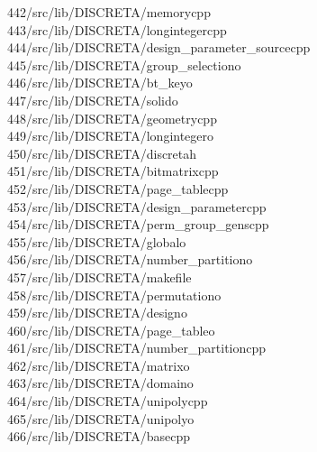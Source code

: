 \begin{tabbing}
442\>/src/lib/DISCRETA/memorycpp\\[0pt]
443\>/src/lib/DISCRETA/longintegercpp\\[0pt]
444\>/src/lib/DISCRETA/design\_parameter\_sourcecpp\\[0pt]
445\>/src/lib/DISCRETA/group\_selectiono\\[0pt]
446\>/src/lib/DISCRETA/bt\_keyo\\[0pt]
447\>/src/lib/DISCRETA/solido\\[0pt]
448\>/src/lib/DISCRETA/geometrycpp\\[0pt]
449\>/src/lib/DISCRETA/longintegero\\[0pt]
450\>/src/lib/DISCRETA/discretah\\[0pt]
451\>/src/lib/DISCRETA/bitmatrixcpp\\[0pt]
452\>/src/lib/DISCRETA/page\_tablecpp\\[0pt]
453\>/src/lib/DISCRETA/design\_parametercpp\\[0pt]
454\>/src/lib/DISCRETA/perm\_group\_genscpp\\[0pt]
455\>/src/lib/DISCRETA/globalo\\[0pt]
456\>/src/lib/DISCRETA/number\_partitiono\\[0pt]
457\>/src/lib/DISCRETA/makefile\\[0pt]
458\>/src/lib/DISCRETA/permutationo\\[0pt]
459\>/src/lib/DISCRETA/designo\\[0pt]
460\>/src/lib/DISCRETA/page\_tableo\\[0pt]
461\>/src/lib/DISCRETA/number\_partitioncpp\\[0pt]
462\>/src/lib/DISCRETA/matrixo\\[0pt]
463\>/src/lib/DISCRETA/domaino\\[0pt]
464\>/src/lib/DISCRETA/unipolycpp\\[0pt]
465\>/src/lib/DISCRETA/unipolyo\\[0pt]
466\>/src/lib/DISCRETA/basecpp\\[0pt]

\end{tabbing}
